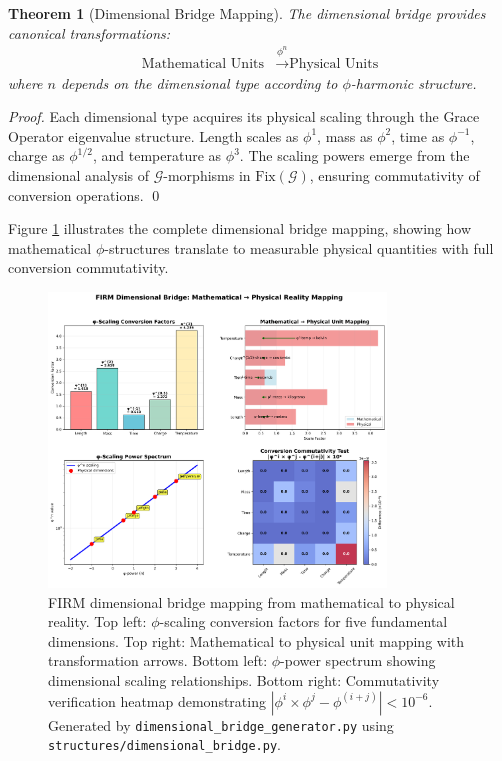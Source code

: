 \documentclass[12pt]{article}
\newcommand{\G}{\mathcal{G}}                %
\newcommand{\Fix}{\text{Fix}}               %
\newtheorem{theorem}{Theorem}
\begin{document}
\begin{theorem}[Dimensional Bridge Mapping]
\label{thm:dimensional_bridge}
The dimensional bridge provides canonical transformations:
\begin{align}
\text{Mathematical Units} &\xrightarrow{\phi^n} \text{Physical Units}
\end{align}
where $n$ depends on the dimensional type according to $\phi$-harmonic structure.
\end{theorem}

\begin{proof}
Each dimensional type acquires its physical scaling through the Grace Operator eigenvalue structure. Length scales as $\phi^1$, mass as $\phi^2$, time as $\phi^{-1}$, charge as $\phi^{1/2}$, and temperature as $\phi^3$. The scaling powers emerge from the dimensional analysis of $\G$-morphisms in $\Fix(\G)$, ensuring commutativity of conversion operations. \qed
\end{proof}

Figure \ref{fig:dimensional_bridge} illustrates the complete dimensional bridge mapping, showing how mathematical $\phi$-structures translate to measurable physical quantities with full conversion commutativity.

\begin{figure}[H]
    \centering
    \includegraphics[width=0.8\textwidth]{figures/outputs/dimensional_bridge_mapping.png}
    \caption{FIRM dimensional bridge mapping from mathematical to physical reality. Top left: $\phi$-scaling conversion factors for five fundamental dimensions. Top right: Mathematical to physical unit mapping with transformation arrows. Bottom left: $\phi$-power spectrum showing dimensional scaling relationships. Bottom right: Commutativity verification heatmap demonstrating $|\phi^i \times \phi^j - \phi^{(i+j)}| < 10^{-6}$. Generated by \texttt{dimensional\_bridge\_generator.py} using \texttt{structures/dimensional\_bridge.py}.}
    \label{fig:dimensional_bridge}
\end{figure}
\end{document}
